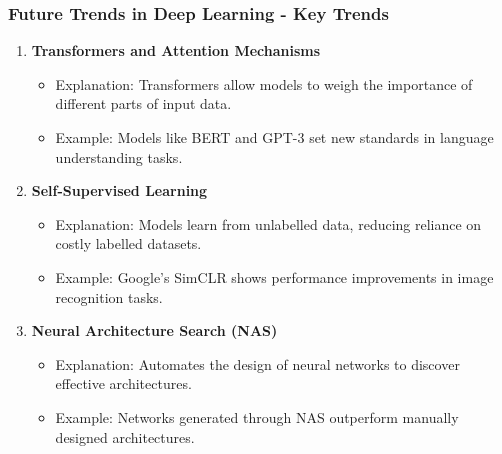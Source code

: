 \documentclass[aspectratio=169]{beamer}
\begin{document}
\begin{frame}[fragile]
    \frametitle{Future Trends in Deep Learning - Key Trends}
    \begin{enumerate}
        \item \textbf{Transformers and Attention Mechanisms}
            \begin{itemize}
                \item Explanation: Transformers allow models to weigh the importance of different parts of input data.
                \item Example: Models like BERT and GPT-3 set new standards in language understanding tasks.
            \end{itemize}
        
        \item \textbf{Self-Supervised Learning}
            \begin{itemize}
                \item Explanation: Models learn from unlabelled data, reducing reliance on costly labelled datasets.
                \item Example: Google’s SimCLR shows performance improvements in image recognition tasks.
            \end{itemize}
        
        \item \textbf{Neural Architecture Search (NAS)}
            \begin{itemize}
                \item Explanation: Automates the design of neural networks to discover effective architectures.
                \item Example: Networks generated through NAS outperform manually designed architectures.
            \end{itemize}
    \end{enumerate}
\end{frame}
\end{document}
